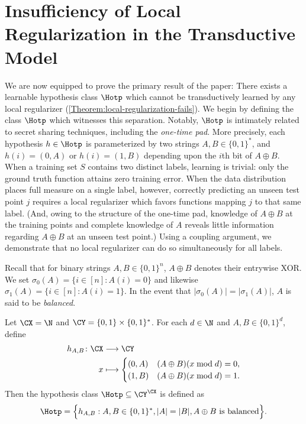 \section{Insufficiency of Local Regularization in the Transductive Model}\label{Section:local-regularization-fails}

We are now equipped to prove the primary result of the paper: There exists a learnable hypothesis class $\Hotp$ which cannot be transductively learned by any local regularizer (\cref{Theorem:local-regularization-fails}). We begin by defining the class $\Hotp$ which witnesses this separation. Notably, $\Hotp$ is intimately related to secret sharing techniques, including the \emph{one-time pad}. More precisely, each hypothesis $h \in \Hotp$ is parameterized by two strings $A, B \in \{0, 1\}^*$, and $h(i) = (0,A)$ or $h(i) = (1,B)$ depending upon the $i$th bit of $A \oplus B$. When a training set $S$ contains two distinct labels, learning is trivial: only the ground truth function attains zero training error. When the data distribution places full measure on a single label, however,  correctly predicting an unseen test point $j$ requires a local regularizer which favors functions mapping $j$ to that same label. (And, owing to the structure of the one-time pad, knowledge of $A \oplus B$ at the training points and complete knowledge of $A$ reveals little information regarding $A \oplus B$ at an unseen test point.) Using a coupling argument, we demonstrate that no local regularizer can do so simultaneously for all labels. 

Recall that for binary strings $A, B \in \{0, 1\}^n$, $A \oplus B$ denotes their entrywise XOR. We set $\sigma_0(A) = \{i \in [n] : A(i) = 0\}$ and likewise $\sigma_1(A) = \{i \in [n] : A(i) = 1\}$. In the event that $|\sigma_0(A)| = |\sigma_1(A)|$, $A$ is said to be \emph{balanced}. 

\begin{definition}\label{Definition:secret-sharing-class}
Let $\CX = \N$ and $\CY = \{0, 1\} \times \{0, 1\}^*$. For each $d \in \N$ and $A, B \in \{0, 1\}^d$, define 
\begin{align*}
h_{A, B} \colon \CX &\longrightarrow \CY \\
x &\longmapsto \begin{cases} (0, A) & (A \oplus B)(x \bmod d) = 0, \\ (1, B) & (A \oplus B)(x \bmod d) = 1. \end{cases} 
\end{align*} 
Then the hypothesis class $\Hotp \subseteq \CY^\CX$ is defined as
\[ \Hotp = \Big \{ h_{A, B} : A, B \in \{0, 1\}^*, |A| = |B|, A \oplus B \text{ is balanced} \Big \}.  \] 
\end{definition}

